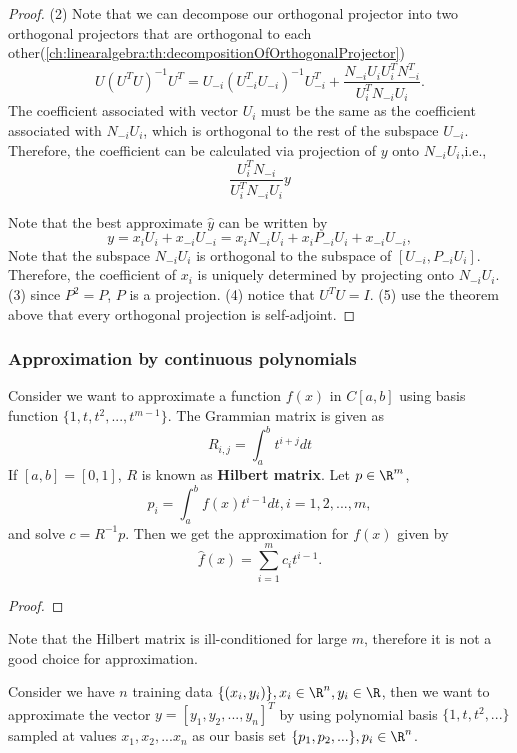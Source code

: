 \begin{refsection}
\begin{proof}
	(2) Note that we can decompose our orthogonal projector into two orthogonal projectors that are orthogonal to each other(\autoref{ch:linearalgebra:th:decompositionOfOrthogonalProjector})
	$$U(U^TU)^{-1}U^T = U_{-i}(U^T_{-i}U_{-i})^{-1}U^T_{-i} + \frac{N_{-i}U_iU_i^TN_{-i}^T}{U_i^TN_{-i}U_i}.$$
	The coefficient associated with vector $U_i$ must be the same as the coefficient associated with $N_{-i}U_i$, which is orthogonal to the rest of the subspace $U_{-i}$. Therefore, the coefficient can be calculated via projection of $y$ onto $N_{-i}U_i$,i.e., $$\frac{U_i^TN_{-i}}{U_i^TN_{-i}U_i}y$$
	
	Note that the best approximate $\hat{y}$ can be written by
	$$y = x_i U_i + x_{-i}U_{-i} = x_i N_{-i}U_i + x_i P_{-i}U_{i} + x_{-i}U_{-i},$$
	Note that the subspace $N_{-i}U_i$ is orthogonal to the subspace of $[U_{-i} , P_{-i}U_i]$. Therefore, the coefficient of $x_i$ is uniquely determined by  projecting onto $N_{-i}U_i$.   
	(3) since $P^2 = P$, $P$ is a projection.
	(4) notice that $U^TU = I$.
	(5) use the theorem above that every orthogonal projection is self-adjoint.
\end{proof}




\subsubsection{Approximation by continuous polynomials}

\begin{lemma}\label{ch:functional-analysis:th:ApproximationViaPolynomial}Consider we want to approximate a function $f(x)$ in $C[a,b]$ using basis function $\{1,t,t^2,...,t^{m-1}\}$. The Grammian matrix is given as
$$R_{i,j}=\int_a^b t^{i+j}dt$$
If $[a,b]=[0,1]$, $R$ is known as \textbf{Hilbert matrix}.
Let 
$p\in \R^m$, $$p_i = \int_a^b f(x)t^{i-1}dt,i=1,2,...,m,$$
and solve $c = R^{-1}p$. Then we get the approximation for $f(x)$ given by
$$\hat{f}(x) = \sum_{i=1}^{m}c_i t^{i-1}.$$
\end{lemma}
\begin{proof}

\end{proof}
\begin{remark}
	Note that the Hilbert matrix is ill-conditioned for large $m$, therefore it is not a good choice for approximation.
\end{remark}

\begin{lemma}\cite{moon2000mathematical}
Consider we have $n$ training data $\{(x_i,y_i)\},x_i\in \R^n, y_i\in \R$, then we want to approximate the vector $y=[y_1,y_2,...,y_n]^T$ by using polynomial basis $\{1,t,t^2,...\}$ sampled at values $x_1,x_2,...x_n$ as our basis set $\{p_1,p_2,...\},p_i\in \R^n$.


\end{lemma}
\end{refsection}
